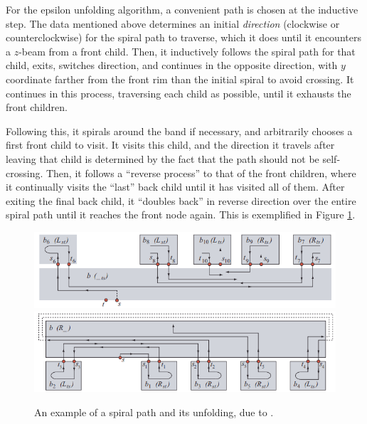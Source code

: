 \documentclass{article}
\begin{document}
For the epsilon unfolding algorithm, a convenient path is chosen at the inductive step.
The data mentioned above determines an initial \emph{direction} (clockwise or counterclockwise) for the spiral path to traverse, which it does until it encounters a $z$-beam from a front child.
Then, it inductively follows the spiral path for that child, exits, switches direction, and continues in the opposite direction, with $y$ coordinate farther from the front rim than the initial spiral to avoid crossing.
It continues in this process, traversing each child as possible, until it exhausts the front children.

Following this, it spirals around the band if necessary, and arbitrarily chooses a first front child to visit.
It visits this child, and the direction it travels after leaving that child is determined by the fact that the path should not be self-crossing.
Then, it follows a ``reverse process'' to that of the front children, where it continually visits the ``last'' back child until it has visited all of them.
After exiting the final back child, it ``doubles back'' in reverse direction over the entire spiral path until it reaches the front node again.
This is exemplified in Figure \ref{Epsilon figure}.

\begin{figure}
  \begin{center}
    \includegraphics[width=\textwidth]{./figs/Recursive_step_example_front.png}\\
    \includegraphics[width=\textwidth]{./figs/Recursive_step_example_back.png}
  \end{center}
  \caption{
    An example of a spiral path and its unfolding, due to \cite[Fig. 3]{Damian_Flatland_Orourke}.
  }\label{Epsilon figure}
\end{figure}
\end{document}
